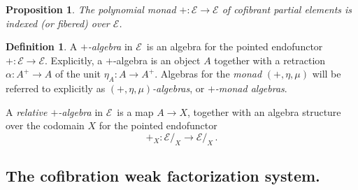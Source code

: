 \documentclass[11pt,reqno]{amsart}
\newcommand{\EE}{\ensuremath{\mathcal{E}}}
\newcommand{\ra}{\ensuremath{\rightarrow}}
\newcommand{\too}{\ensuremath{\longrightarrow}}
\newtheorem{proposition}[theorem]{Proposition}
\theoremstyle{remark}
\theoremstyle{definition}
\newtheorem{definition}[theorem]{Definition}
\begin{document}
\begin{proposition}\label{prop:fiberedpolymonad}
The polynomial monad $+ : \EE \ra \EE$ of \emph{cofibrant partial elements} is indexed (or fibered) over \EE.
\end{proposition}

\begin{definition}\label{def:+alg}
A \emph{$+$-algebra} in \EE\ is an algebra for the pointed endofunctor $+ : \EE\ra \EE$.  Explicitly, a $+$-algebra is an object $A$ together with a retraction $\alpha : A^+\ra A$ of the unit $\eta_A : A \ra A^+$.  Algebras for the \emph{monad} $(+, \eta, \mu)$ will be referred to explicitly as \emph{$(+, \eta, \mu)$-algebras}, or \emph{$+$-monad algebras}. 

A \emph{relative $+$-algebra} in \EE\ is a map $A \ra X$, together with an algebra structure over the codomain $X$ for the pointed endofunctor 
\[
+_X : \EE/_X \too \EE/_X\,.
\]
\end{definition}

\subsection*{The cofibration weak factorization system.}
\end{document}
